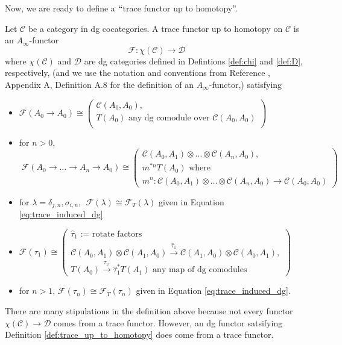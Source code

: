 %
Now, we are ready to define a $``$trace functor up 
to homotopy''.
%
\begin{defn} \label{def:trace_up_to_homotopy}
Let $\mathcal{C}$ be a category in dg 
cocategories. A trace functor up to homotopy on 
$\mathcal{C}$ is an $A_\infty$-functor 
$$\mathcal{F}: \chi(\mathcal{C}) \to \mathcal{D}$$
where $\chi(\mathcal{C})$ and $\mathcal{D}$ are 
dg categories defined in Defintions \ref{def:chi} 
and \ref{def:D}, respectively, (and we use the 
notation and conventions from Reference \cite{F}, 
Appendix A, Definition A.8 for the definition of an 
$A_\infty$-functor,) satisfying
\begin{itemize}
	\item $\mathcal{F}(A_0 \to A_0) \cong 
	\begin{pmatrix}
		\mathcal{C}(A_0,A_0),\\
		T(A_0) \textrm{ any dg comodule over }\mathcal{C}(A_0,A_0)\\
	\end{pmatrix}$
	\item for $n>0$,$\; \mathcal{F}
	(A_0 \to \dots \to A_n \to A_0) \cong	
	\begin{pmatrix}
		\mathcal{C}(A_0,A_1) \otimes \dots \otimes \mathcal{C}(A_n,A_0),\\
		m^{*n} T(A_0) \textrm{ where }\\
		m^n: \mathcal{C}(A_0,A_1) \otimes \dots \otimes \mathcal{C}(A_n,A_0) \to \mathcal{C}(A_0,A_0)
	\end{pmatrix}$
	\item for $\lambda = \delta_{j,n}, \sigma_{i,n}$,  
	$\; \mathcal{F}(\lambda) \cong 
	\mathcal{F}_T(\lambda)$ given in Equation \ref{eq:trace_induced_dg}
	\item $\mathcal{F}(\tau_1) \cong 
	\begin{pmatrix}
		\textrm{$\hat{\tau}_1$ := rotate factors}\\
		\mathcal{C}(A_0,A_1) \otimes \mathcal{C}(A_1,A_0)
		\xrightarrow{\hat{\tau}_1}
		\mathcal{C}(A_1,A_0) \otimes \mathcal{C}(A_0,A_1),\\
		T(A_0)
		\xrightarrow{\tau_{1!}}
		\hat{\tau}_1^* T(A_1) \textrm{ any map of dg comodules}
	\end{pmatrix}$
	\item for $n>1$, $\mathcal{F}(\tau_n) \cong 
	\mathcal{F}_T(\tau_n)$ given in Equation \ref{eq:trace_induced_dg}.
\end{itemize}
\end{defn}
There are many stipulations in the definition above 
because not every functor $\chi(\mathcal{C}) \to \mathcal{D}$
comes from a trace functor. However, an dg functor 
satsifying Definition \ref{def:trace_up_to_homotopy} 
does come from a trace functor.















